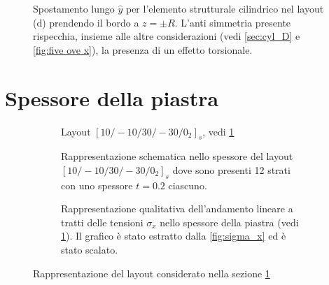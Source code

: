 \documentclass[a4paper,num-refs]{oup-contemporary}
\begin{document}
\begin{figure}[bt!]
	\def\svgwidth{\linewidth}
	
	\caption{Spostamento lungo $\hat y$ per l'elemento strutturale cilindrico nel layout (d) prendendo il bordo a $z=\pm R$. L'anti simmetria presente rispecchia, insieme alle altre considerazioni (vedi \cref{sec:cyl_D} e \cref{fig:five ove x}), la presenza di un effetto torsionale.}
\label{fig:D_extra}
\end{figure}




\section{Spessore della piastra}
\label{sec:final_thick}




\begin{figure}[bt!]
	\centering
	\begin{subfigure}[c]{0.28\textwidth}
		\centering
		\def\svgwidth{\linewidth}
	
		\caption{Layout $\left[10/-10/30/-30/0_2\right]_s$, vedi \cref{sec:final_thick}}
			\label{fig:last_case_schema}
	\end{subfigure}
	\hfill
	\begin{subfigure}[c]{0.28\textwidth}
		\centering
	\def\svgwidth{\linewidth}
		
		\caption{Rappresentazione schematica nello spessore del layout  $\left[10/-10/30/-30/0_2\right]_s$ dove sono presenti 12 strati con uno spessore $t=0.2$ ciascuno.}
		
	\end{subfigure}
	\hfill
	\begin{subfigure}[c]{0.35\textwidth}
		\centering
	\def\svgwidth{\linewidth}
	
		\caption{Rappresentazione qualitativa dell'andamento lineare a tratti delle tensioni $\sigma_x$ nello spessore della piastra (vedi \cref{sec:final_thick}). Il grafico è stato estratto dalla \cref{fig:sigma_x} ed è stato scalato. }
		
	\end{subfigure}
	\hfill
	\caption{Rappresentazione del layout considerato nella sezione \cref{sec:final_thick} }
	\label{fig:last_case}
\end{figure}
\end{document}
